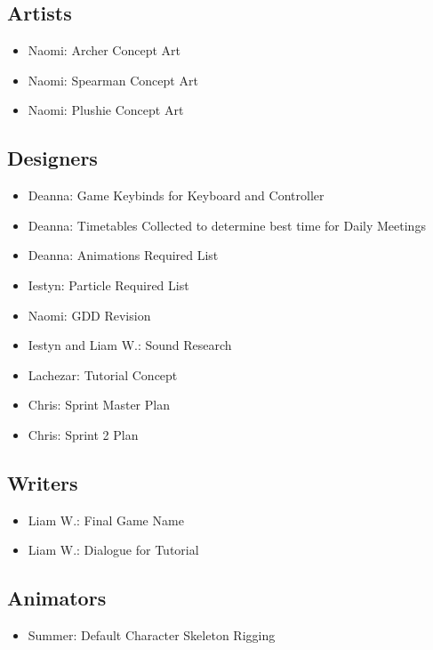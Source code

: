 \documentclass{article}
\begin{document}
\subsection{Artists}
\begin{itemize}
    \item Naomi: Archer Concept Art
    \item Naomi: Spearman Concept Art
    \item Naomi: Plushie Concept Art
\end{itemize}

\subsection{Designers}
\begin{itemize}
    \item Deanna: Game Keybinds for Keyboard and Controller
    \item Deanna: Timetables Collected to determine best time for Daily Meetings
    \item Deanna: Animations Required List
    \item Iestyn: Particle Required List
    \item Naomi: GDD Revision
    \item Iestyn and Liam W.: Sound Research
    \item Lachezar: Tutorial Concept
    \item Chris: Sprint Master Plan
    \item Chris: Sprint 2 Plan
\end{itemize}

\subsection{Writers}
\begin{itemize}
    \item Liam W.: Final Game Name
    \item Liam W.: Dialogue for Tutorial
\end{itemize}

\subsection{Animators}
\begin{itemize}
    \item Summer: Default Character Skeleton Rigging
\end{itemize}
\end{document}
